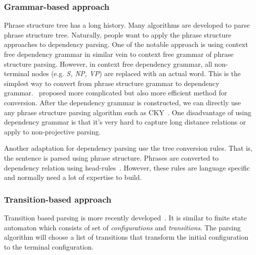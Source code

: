 \documentclass[12pt,twoside,final,hidelinks]{ltthesis}
\theoremstyle{definition}
\begin{document}
\subsubsection{Grammar-based approach}
Phrase structure tree has a long history. Many algorithms are developed to parse phrase structure tree. Naturally, people want to apply the phrase structure approaches to dependency parsing. One of the notable approach is using context free dependency grammar in similar vein to context free grammar of phrase structure parsing. However, in context free dependency grammar, all non-terminal nodes (e.g. \textit{S, NP, VP}) are replaced with an actual word. This is the simplest way to convert from phrase structure grammar to dependency grammar.~ proposed more complicated but also more efficient method for conversion. After the dependency grammar is constructed, we can directly use any phrase structure parsing algorithm such as CKY~\cite{Younger1967189}. One disadvantage of using dependency grammar is that it's very hard to capture long distance relations or apply to non-projective parsing.  

Another adaptation for dependency parsing use the tree conversion rules. That is, the sentence is parsed using phrase structure. Phrases are converted to dependency relation using head-rules~\cite{Marneffe06generatingtyped,Yamada03statisticaldependency}. However, these rules are language specific and normally need a lot of expertise to build. 

\subsubsection{Transition-based approach}
Transition based parsing is more recently developed~\cite{Nivre:2008:ADI}. It is similar to finite state automaton which consists of set of \textit{configurations} and \textit{transitions}. The parsing algorithm will choose a list of transitions that transform the initial configuration to the terminal configuration. 
\end{document}
